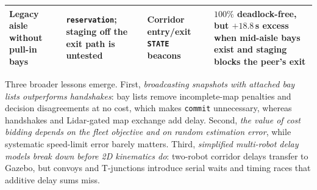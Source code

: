 \begin{table}[!t]
{\begin{tabular}{@{}>{\raggedright\arraybackslash}p{}>{\raggedright\arraybackslash}p{}>{\raggedright\arraybackslash}p{}>{\raggedright\arraybackslash}p{}@{}}
Legacy aisle without pull-in bays & \texttt{reservation}; staging off the exit path is untested & Corridor entry/exit \texttt{STATE} beacons & $100\%$ deadlock-free, but $+18.8$\,s excess when mid-aisle bays exist and staging blocks the peer's exit \\\bottomrule
\end{tabular}}
\end{table}

Three broader lessons emerge. First, \emph{broadcasting snapshots with attached bay lists outperforms handshakes}: bay lists remove incomplete-map penalties and decision disagreements at no cost, which makes \texttt{commit} unnecessary, whereas handshakes and Lidar-gated map exchange add delay. Second, \emph{the value of cost bidding depends on the fleet objective and on random estimation error}, while systematic speed-limit error barely matters. Third, \emph{simplified multi-robot delay models break down before 2D kinematics do}: two-robot corridor delays transfer to Gazebo, but convoys and T-junctions introduce serial waits and timing races that additive delay sums miss.

